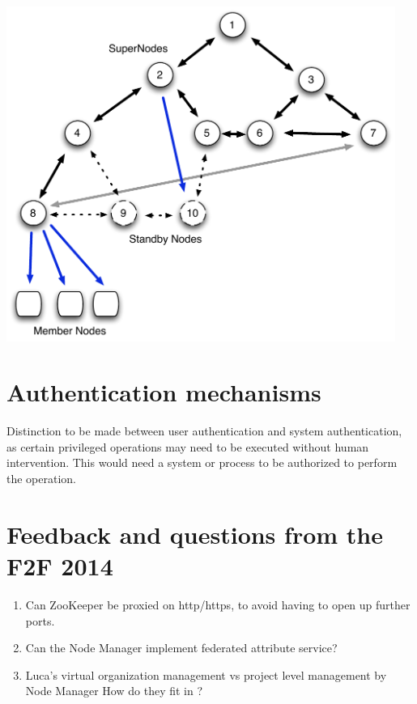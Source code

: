 \documentclass[oneside,12pt]{memoir}
\def\nm{Node Manager{ }}
\begin{document}
\begin{center}
\includegraphics[width=5in]{presentation/Node-comm-v2.pdf}
\end{center}


\section{Authentication mechanisms}
Distinction to be made between user authentication and system authentication, as certain privileged operations may need to be executed without human intervention. This would need a system or process to be authorized to perform the operation. 

\section{Feedback and questions from the F2F 2014}
\begin{enumerate}
\item Can ZooKeeper be proxied on http/https, to avoid having to open up further ports.
\item Can the \nm implement federated attribute service?
\item Luca's virtual organization management vs project level management by \nm How do they fit in ?
\end{enumerate}
\end{document}
